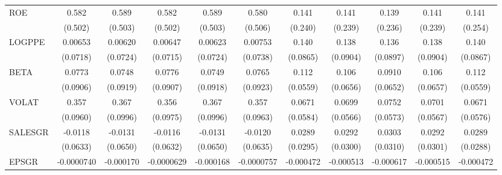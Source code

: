 \begin{table}[htbp]
\begin{tabular}{l*{10}{c}}
ROE             &    0.582         &    0.589         &    0.582         &    0.589         &    0.580         &    0.141         &    0.141         &    0.139         &    0.141         &    0.141         \\
                &  (0.502)         &  (0.503)         &  (0.502)         &  (0.503)         &  (0.506)         &  (0.240)         &  (0.239)         &  (0.236)         &  (0.239)         &  (0.254)         \\
LOGPPE          &  0.00653         &  0.00620         &  0.00647         &  0.00623         &  0.00753         &    0.140         &    0.138         &    0.136         &    0.138         &    0.140         \\
                & (0.0718)         & (0.0724)         & (0.0715)         & (0.0724)         & (0.0738)         & (0.0865)         & (0.0904)         & (0.0897)         & (0.0904)         & (0.0867)         \\
BETA            &   0.0773         &   0.0748         &   0.0776         &   0.0749         &   0.0765         &    0.112\sym{*}  &    0.106         &   0.0910         &    0.106         &    0.112\sym{*}  \\
                & (0.0906)         & (0.0919)         & (0.0907)         & (0.0918)         & (0.0923)         & (0.0559)         & (0.0656)         & (0.0652)         & (0.0657)         & (0.0559)         \\
VOLAT           &    0.357\sym{***}&    0.367\sym{***}&    0.356\sym{***}&    0.367\sym{***}&    0.357\sym{***}&   0.0671         &   0.0699         &   0.0752         &   0.0701         &   0.0671         \\
                & (0.0960)         & (0.0996)         & (0.0975)         & (0.0996)         & (0.0963)         & (0.0584)         & (0.0566)         & (0.0573)         & (0.0567)         & (0.0576)         \\
SALESGR         &  -0.0118         &  -0.0131         &  -0.0116         &  -0.0131         &  -0.0120         &   0.0289         &   0.0292         &   0.0303         &   0.0292         &   0.0289         \\
                & (0.0633)         & (0.0650)         & (0.0632)         & (0.0650)         & (0.0635)         & (0.0295)         & (0.0300)         & (0.0310)         & (0.0301)         & (0.0288)         \\
EPSGR           &-0.0000740         &-0.000170         &-0.0000629         &-0.000168         &-0.0000757         &-0.000472         &-0.000513         &-0.000617         &-0.000515         &-0.000472         \\

\end{tabular}
\end{table}
